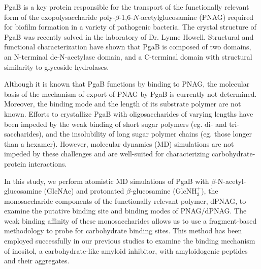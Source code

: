 PgaB is a key protein responsible for the transport of the functionally relevant form of the exopolysaccharide poly-$\beta$-1,6-$N$-acetylglucosamine (PNAG) required for biofilm formation in a variety of pathogenic bacteria.\cite{Little:2012dp} The crystal structure of PgaB was recently solved in the laboratory of Dr. Lynne Howell.\cite{Little:2012dp} Structural and functional characterization have shown that PgaB is composed of two domains, an N-terminal de-N-acetylase domain, and a C-terminal domain with structural similarity to glycoside hydrolases.\cite{Little:2012dp}

Although it is known that PgaB functions by binding to PNAG, the molecular basis of the mechanism of export of PNAG by PgaB is currently not determined.  Moreover, the binding mode and the length of its substrate polymer are not known.
Efforts to crystallize PgaB with oligosaccharides of varying lengths have been impeded by the weak binding of short sugar polymers (eg. di- and tri-saccharides), and the insolubility of long sugar polymer chains (eg. those longer than a hexamer). However, molecular dynamics (MD) simulations are not impeded by these challenges and are well-suited for characterizing carbohydrate-protein interactions.\cite{Fadda:2010p5889}

In this study, we perform atomistic MD simulations of PgaB with $\beta$-N-acetyl-glucosamine (GlcNAc) and protonated $\beta$-glucosamine (GlcNH$_{3}^{+}$), the monosaccharide components of the functionally-relevant polymer, dPNAG, to examine the putative binding site and binding modes of PNAG/dPNAG.  The weak binding affinity of these monosaccharides allows us to use a fragment-based methodology to probe for carbohydrate binding sites.  This method has been employed successfully in our previous studies to examine the binding mechanism of inositol, a carbohydrate-like amyloid inhibitor, with amyloidogenic peptides and their aggregates.\cite{Li:2012bx}

